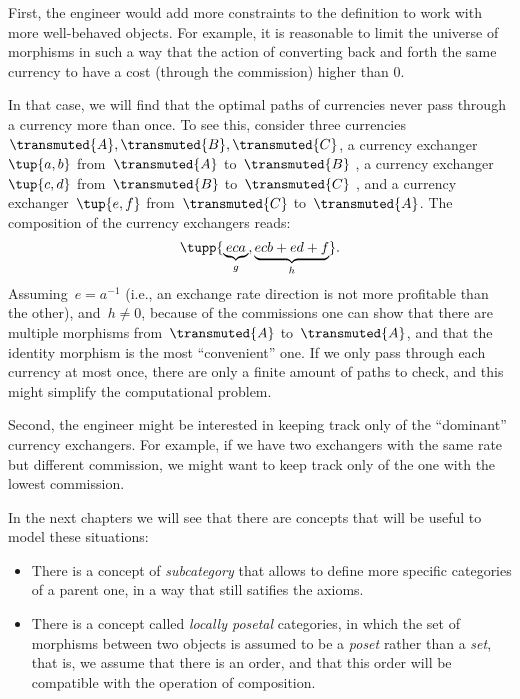 First, the engineer would add more constraints to the definition to work with more well-behaved objects. For example, it is reasonable to limit the universe of morphisms in such a way that the action of converting back and forth the same currency to have a cost (through the commission) higher than 0.

In that case, we will find that the optimal paths of currencies never pass through a currency more than once. To see this, consider three currencies~$\transmuted{A},\transmuted{B},\transmuted{C}$, a currency exchanger~$\tup{a,b}$ from~$\transmuted{A}$ to~$\transmuted{B}$ , a currency exchanger~$\tup{c,d}$ from~$\transmuted{B}$ to~$\transmuted{C}$ , and a currency exchanger~$\tup{e,f}$ from~$\transmuted{C}$ to~$\transmuted{A}$.
The composition of the currency exchangers reads:
\begin{equation*}
    \tupp{\underbrace{eca}_{g}, \underbrace{ecb+ed+f}_{h}}.
\end{equation*}
Assuming~$e=a^{-1}$ (i.e., an exchange rate direction is not more profitable than the other), and~$h\neq 0$, because of the commissions one can show that there are multiple morphisms from~$\transmuted{A}$ to~$\transmuted{A}$, and that the identity morphism is the most ``convenient'' one.
If we only pass through each currency at most once, there are only a finite amount of paths to check, and this might simplify the computational problem.

Second, the engineer might be interested in keeping track only of the ``dominant'' currency exchangers.
For example, if we have two exchangers with the same rate but different commission, we might want to keep track only of the one with the lowest commission.

In the next chapters we will see that there are concepts that will be useful to model these situations:
\begin{itemize}
    \item There is a concept of \emph{subcategory} that allows to define more specific
    categories of a parent one, in a way that still satifies the axioms.
    \item There is a concept called \emph{locally posetal} categories, in which the
    set of morphisms between two objects is assumed to be a \emph{poset} rather than a \emph{set},
    that is, we assume that there is an order, and that this order will be compatible with the operation of composition.
\end{itemize}



